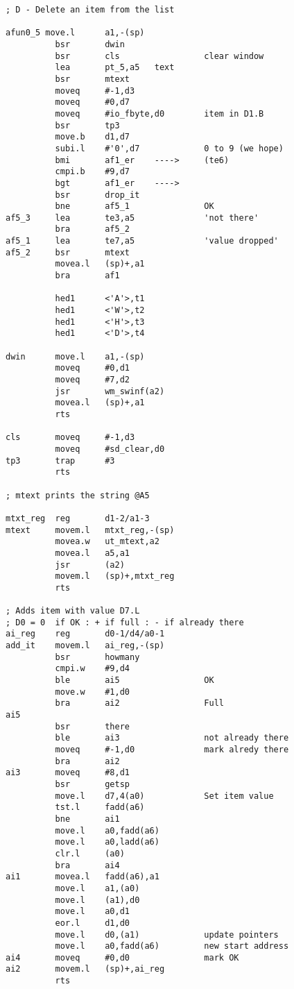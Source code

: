 \begin{lstlisting}[firstnumber=1,caption={George's Linked List Example Program}]
; D - Delete an item from the list

afun0_5 move.l      a1,-(sp)
          bsr       dwin
          bsr       cls                 clear window
          lea       pt_5,a5   text
          bsr       mtext
          moveq     #-1,d3
          moveq     #0,d7
          moveq     #io_fbyte,d0        item in D1.B
          bsr       tp3
          move.b    d1,d7
          subi.l    #'0',d7             0 to 9 (we hope)
          bmi       af1_er    ---->     (te6)
          cmpi.b    #9,d7
          bgt       af1_er    ---->
          bsr       drop_it
          bne       af5_1               OK
af5_3     lea       te3,a5              'not there'
          bra       af5_2
af5_1     lea       te7,a5              'value dropped'
af5_2     bsr       mtext
          movea.l   (sp)+,a1
          bra       af1

          hed1      <'A'>,t1
          hed1      <'W'>,t2
          hed1      <'H'>,t3
          hed1      <'D'>,t4

dwin      move.l    a1,-(sp)
          moveq     #0,d1
          moveq     #7,d2
          jsr       wm_swinf(a2)
          movea.l   (sp)+,a1
          rts

cls       moveq     #-1,d3
          moveq     #sd_clear,d0
tp3       trap      #3
          rts

; mtext prints the string @A5

mtxt_reg  reg       d1-2/a1-3
mtext     movem.l   mtxt_reg,-(sp)
          movea.w   ut_mtext,a2
          movea.l   a5,a1
          jsr       (a2)
          movem.l   (sp)+,mtxt_reg
          rts

; Adds item with value D7.L
; D0 = 0  if OK : + if full : - if already there
ai_reg    reg       d0-1/d4/a0-1
add_it    movem.l   ai_reg,-(sp)
          bsr       howmany
          cmpi.w    #9,d4
          ble       ai5                 OK
          move.w    #1,d0
          bra       ai2                 Full
ai5
          bsr       there
          ble       ai3                 not already there
          moveq     #-1,d0              mark alredy there
          bra       ai2
ai3       moveq     #8,d1
          bsr       getsp
          move.l    d7,4(a0)            Set item value
          tst.l     fadd(a6)
          bne       ai1
          move.l    a0,fadd(a6)
          move.l    a0,ladd(a6)
          clr.l     (a0)
          bra       ai4
ai1       movea.l   fadd(a6),a1
          move.l    a1,(a0)
          move.l    (a1),d0
          move.l    a0,d1
          eor.l     d1,d0
          move.l    d0,(a1)             update pointers
          move.l    a0,fadd(a6)         new start address
ai4       moveq     #0,d0               mark OK
ai2       movem.l   (sp)+,ai_reg
          rts


\end{lstlisting}
